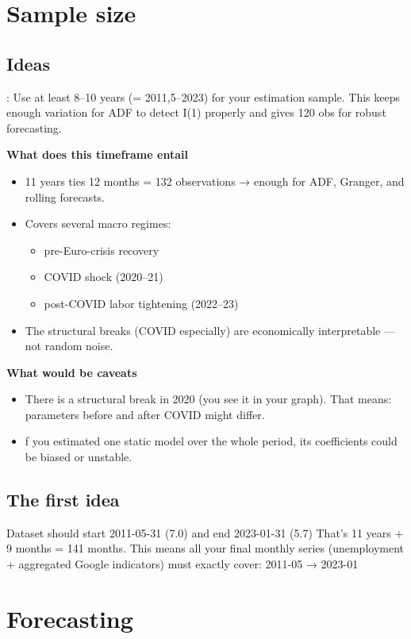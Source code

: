 \documentclass{article}
\begin{document}
\section{Sample size}

\subsection{Ideas}:
Use at least 8–10 years (= 2011,5–2023) for your estimation sample.
This keeps enough variation for ADF to detect I(1) properly and gives 120 obs for robust forecasting.

\textbf{What does this timeframe entail}
\begin{itemize}
    \item 11 years ties 12 months = 132 observations → enough for ADF, Granger, and rolling forecasts.
    \item Covers several macro regimes:
    \begin{itemize}
        \item pre-Euro-crisis recovery
        \item COVID shock (2020–21)
        \item post-COVID labor tightening (2022–23)
    \end{itemize}
    \item  The structural breaks (COVID especially) are economically interpretable — not random noise.
\end{itemize}

\textbf{What would be caveats}
\begin{itemize}
    \item There is a structural break in 2020 (you see it in your graph).
That means: parameters before and after COVID might differ.
\item f you estimated one static model over the whole period, its coefficients could be biased or unstable.
\end{itemize}

\subsection{The first idea}
Dataset should start 2011-05-31 (7.0) and end 2023-01-31 (5.7)
That’s 11 years + 9 months = 141 months. This means all your final monthly series (unemployment + aggregated Google indicators) must exactly cover: 2011-05 → 2023-01

\section{Forecasting}
\end{document}
